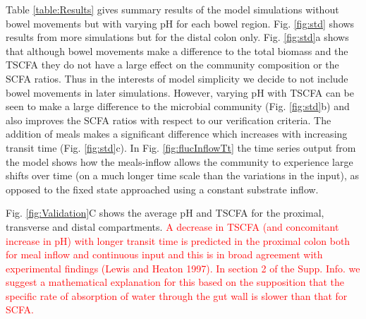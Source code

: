 \documentclass[a4paper]{article}
\begin{document}
Table \ref{table:Results} gives summary results of the model simulations without bowel movements but with varying pH for each bowel region. Fig. \ref{fig:std} shows results from more simulations but for the distal colon only.
Fig. \ref{fig:std}a shows that although bowel movements make a difference to the total biomass and the TSCFA they do not have a large effect on the community composition or the SCFA ratios. Thus in the interests of model simplicity we decide to not include bowel movements in later simulations.
However, varying pH with TSCFA can be seen to make a large difference to the microbial community (Fig. \ref{fig:std}b) and also improves the SCFA ratios with respect to our verification criteria.
The addition of meals makes a significant difference which increases with increasing transit time (Fig. \ref{fig:std}c). 
In Fig. \ref{fig:flucInflowTt} the time series output from the model shows how the meals-inflow allows the community to experience large shifts over time (on a much longer time scale than the variations in the input), as opposed to the fixed state approached using a constant substrate inflow.

Fig. \ref{fig:Validation}C shows the average pH and TSCFA for the proximal, transverse and distal compartments. 
\textcolor{red}{A decrease in TSCFA (and concomitant increase in pH) with longer transit time is predicted in the proximal colon both for meal inflow and continuous input and this is in broad agreement with experimental findings (Lewis and Heaton 1997). In section 2 of the Supp. Info. we suggest a mathematical explanation for this based on the supposition that the specific rate of absorption of water through the gut wall is slower than that for SCFA.
}
\end{document}
